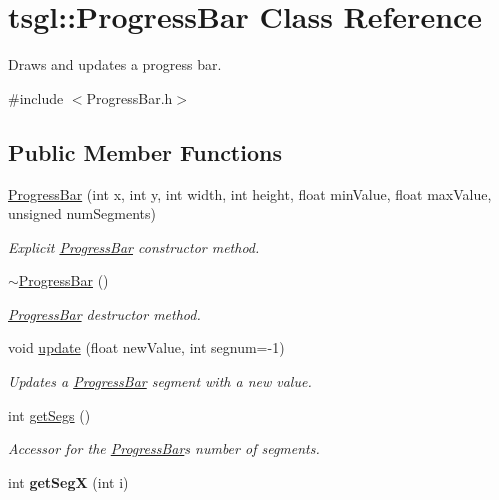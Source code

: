 \hypertarget{classtsgl_1_1_progress_bar}{}\section{tsgl\+:\+:Progress\+Bar Class Reference}
\label{classtsgl_1_1_progress_bar}


Draws and updates a progress bar.  




{\ttfamily \#include $<$Progress\+Bar.\+h$>$}

\subsection*{Public Member Functions}
\begin{DoxyCompactItemize}
\item 
\hyperlink{classtsgl_1_1_progress_bar_ac79018d09a75c490de3490306146c010}{Progress\+Bar} (int x, int y, int width, int height, float min\+Value, float max\+Value, unsigned num\+Segments)
\begin{DoxyCompactList}\small\item\em Explicit \hyperlink{classtsgl_1_1_progress_bar}{Progress\+Bar} constructor method. \end{DoxyCompactList}\item 
\hyperlink{classtsgl_1_1_progress_bar_aa3ad600db2cbd0e8f9221c264535df21}{$\sim$\+Progress\+Bar} ()
\begin{DoxyCompactList}\small\item\em \hyperlink{classtsgl_1_1_progress_bar}{Progress\+Bar} destructor method. \end{DoxyCompactList}\item 
void \hyperlink{classtsgl_1_1_progress_bar_a4274998e4935f33eb9212b2174d9c0c5}{update} (float new\+Value, int segnum=-\/1)
\begin{DoxyCompactList}\small\item\em Updates a \hyperlink{classtsgl_1_1_progress_bar}{Progress\+Bar} segment with a new value. \end{DoxyCompactList}\item 
int \hyperlink{classtsgl_1_1_progress_bar_a25576903783f18f8d74570aed2f80d95}{get\+Segs} ()
\begin{DoxyCompactList}\small\item\em Accessor for the \hyperlink{classtsgl_1_1_progress_bar}{Progress\+Bar}\textquotesingle{}s number of segments. \end{DoxyCompactList}\item 
\hypertarget{classtsgl_1_1_progress_bar_a7ecdc35e44496db7cf2e25b2ee6577d4}{}int {\bfseries get\+Seg\+X} (int i)\label{classtsgl_1_1_progress_bar_a7ecdc35e44496db7cf2e25b2ee6577d4}


\end{DoxyCompactItemize}
